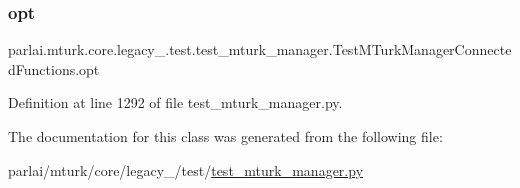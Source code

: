 \subsubsection{\texorpdfstring{opt}{opt}}
{\footnotesize\ttfamily parlai.\+mturk.\+core.\+legacy\+\_.\+test.\+test\+\_\+mturk\+\_\+manager.\+Test\+M\+Turk\+Manager\+Connected\+Functions.\+opt}



Definition at line 1292 of file test\+\_\+mturk\+\_\+manager.\+py.



The documentation for this class was generated from the following file\+:\begin{DoxyCompactItemize}
\item 
parlai/mturk/core/legacy\+\_/test/\hyperlink{legacy__2018_2test_2test__mturk__manager_8py}{test\+\_\+mturk\+\_\+manager.\+py}\end{DoxyCompactItemize}
